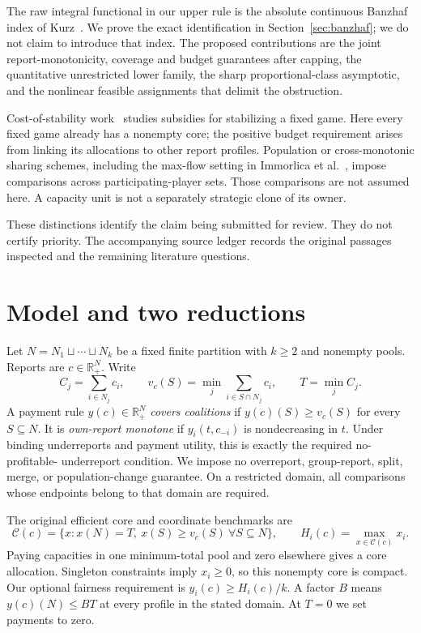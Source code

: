 \documentclass[11pt]{article}
\theoremstyle{definition}\newtheorem{definition}[theorem]{Definition}
\theoremstyle{remark}\newtheorem{remark}[theorem]{Remark}
\newcommand{\R}{\mathbb R}
\newcommand{\core}{\mathcal C}
\begin{document}
The raw integral functional in our upper rule is the absolute continuous
Banzhaf index of Kurz~\cite[Definition~6.11]{Kurz}. We prove the exact
identification in Section~\ref{sec:banzhaf}; we do not claim to introduce
that index. The proposed contributions are the joint report-monotonicity,
coverage and budget guarantees after capping, the quantitative unrestricted
lower family, the sharp proportional-class asymptotic, and the nonlinear
feasible assignments that delimit the obstruction.

Cost-of-stability work~\cite{Bachrach} studies subsidies for stabilizing a
fixed game. Here every fixed game already has a nonempty core; the positive
budget requirement arises from linking its allocations to other report
profiles. Population or cross-monotonic sharing schemes, including the
max-flow setting in Immorlica et al.~\cite{Immorlica}, impose comparisons
across participating-player sets. Those comparisons are not assumed here.
A capacity unit is not a separately strategic clone of its owner.

These distinctions identify the claim being submitted for review. They do
not certify priority. The accompanying source ledger records the original
passages inspected and the remaining literature questions.

\section{Model and two reductions}\label{sec:model}
Let $N=N_1\sqcup\cdots\sqcup N_k$ be a fixed finite partition with
$k\ge2$ and nonempty pools. Reports are $c\in\R_+^N$. Write
\[
 C_j=\sum_{i\in N_j}c_i,\qquad
 v_c(S)=\min_j\sum_{i\in S\cap N_j}c_i,\qquad T=\min_j C_j.
\]
A payment rule $y(c)\in\R_+^N$ \emph{covers coalitions} if
$y(c)(S)\ge v_c(S)$ for every $S\subseteq N$. It is \emph{own-report
monotone} if $y_i(t,c_{-i})$ is nondecreasing in $t$. Under binding
underreports and payment utility, this is exactly the required no-profitable-
underreport condition. We impose no overreport, group-report, split, merge,
or population-change guarantee. On a restricted domain, all comparisons
whose endpoints belong to that domain are required.

The original efficient core and coordinate benchmarks are
\[
 \core(c)=\{x:x(N)=T,\ x(S)\ge v_c(S)\ \forall S\subseteq N\},
 \qquad H_i(c)=\max_{x\in\core(c)}x_i.
\]
Paying capacities in one minimum-total pool and zero elsewhere gives a core
allocation. Singleton constraints imply $x_i\ge0$, so this nonempty core is
compact. Our optional fairness requirement is $y_i(c)\ge H_i(c)/k$.
A factor $B$ means $y(c)(N)\le BT$ at every profile in the stated domain.
At $T=0$ we set payments to zero.
\end{document}
